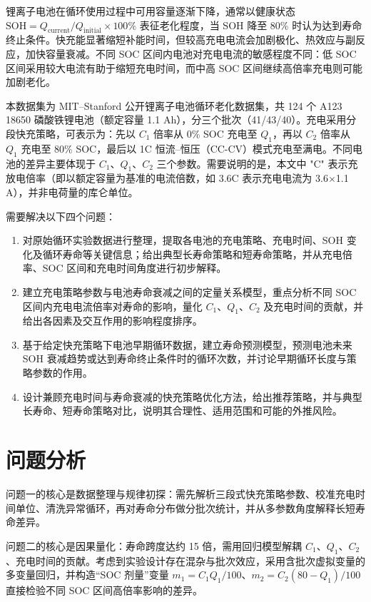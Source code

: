 \documentclass[withoutpreface]{cumcmthesis}
\begin{document}
锂离子电池在循环使用过程中可用容量逐渐下降，通常以健康状态 $\mathrm{SOH}=Q_{\mathrm{current}}/Q_{\mathrm{initial}}\times100\%$ 表征老化程度，当 SOH 降至 80\% 时认为达到寿命终止条件。快充能显著缩短补能时间，但较高充电电流会加剧极化、热效应与副反应，加快容量衰减。不同 SOC 区间内电池对充电电流的敏感程度不同：低 SOC 区间采用较大电流有助于缩短充电时间，而中高 SOC 区间继续高倍率充电则可能加剧老化。

本数据集为 MIT--Stanford 公开锂离子电池循环老化数据集，共 124 个 A123 18650 磷酸铁锂电池（额定容量 1.1 Ah），分三个批次（41/43/40）。充电采用分段快充策略，可表示为：先以 $C_1$ 倍率从 0\% SOC 充电至 $Q_1$，再以 $C_2$ 倍率从 $Q_1$ 充电至 80\% SOC，最后以 1C 恒流--恒压（CC-CV）模式充电至满电。不同电池的差异主要体现于 $C_1$、$Q_1$、$C_2$ 三个参数。需要说明的是，本文中 "C" 表示充放电倍率（即以额定容量为基准的电流倍数，如 3.6C 表示充电电流为 3.6$\times$1.1 A），并非电荷量的库仑单位。

需要解决以下四个问题：
\begin{enumerate}
\item 对原始循环实验数据进行整理，提取各电池的充电策略、充电时间、SOH 变化及循环寿命等关键信息；给出典型长寿命策略和短寿命策略，并从充电倍率、SOC 区间和充电时间角度进行初步解释。
\item 建立充电策略参数与电池寿命衰减之间的定量关系模型，重点分析不同 SOC 区间内充电电流倍率对寿命的影响，量化 $C_1$、$Q_1$、$C_2$ 及充电时间的贡献，并给出各因素及交互作用的影响程度排序。
\item 基于给定快充策略下电池早期循环数据，建立寿命预测模型，预测电池未来 SOH 衰减趋势或达到寿命终止条件时的循环次数，并讨论早期循环长度与策略参数的作用。
\item 设计兼顾充电时间与寿命衰减的快充策略优化方法，给出推荐策略，并与典型长寿命、短寿命策略对比，说明其合理性、适用范围和可能的外推风险。
\end{enumerate}

\section{问题分析}

问题一的核心是数据整理与规律初探：需先解析三段式快充策略参数、校准充电时间单位、清洗异常循环，再对寿命分布做分批次统计，并从多参数角度解释长短寿命差异。

问题二的核心是因果量化：寿命跨度达约 15 倍，需用回归模型解耦 $C_1$、$Q_1$、$C_2$、充电时间的贡献。考虑到实验设计存在混杂与批次效应，采用含批次虚拟变量的多变量回归，并构造“SOC 剂量”变量 $m_1=C_1Q_1/100$、$m_2=C_2(80-Q_1)/100$ 直接检验不同 SOC 区间高倍率影响的差异。
\end{document}
